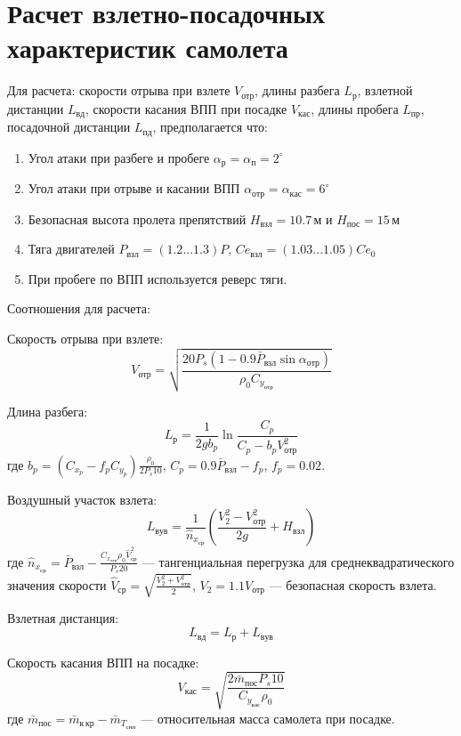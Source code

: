 \section{Расчет взлетно-посадочных характеристик самолета}
Для расчета: скорости отрыва при взлете $V_{отр}$, длины разбега
$L_{р}$, взлетной дистанции $L_{вд}$, скорости касания ВПП при посадке
$V_{кас}$, длины пробега $L_{пр}$, посадочной дистанции $L_{пд}$, предполагается что:
\begin{enumerate}
    \item Угол атаки при разбеге и пробеге $\alpha_р = \alpha_{п} = 2^\circ$ 
    \item Угол атаки при отрыве и касании ВПП $\alpha_{отр} = \alpha_{кас} = 6^\circ$
    \item Безопасная высота пролета препятствий $H_{взл} = 10.7\, м$ и $H_{пос} = 15\, м$
    \item Тяга двигателей $P_{взл} = (1.2 ... 1.3)P$, $Ce_{взл} = (1.03 ... 1.05) Ce_0$ 
    \item При пробеге по ВПП используется реверс тяги.
\end{enumerate}
Соотношения для расчета:

Скорость отрыва при взлете: 
\begin{equation}
    V_{отр} = \sqrt{\frac{20 P_s (1 - 0.9 \bar{P}_{взл} \sin{\alpha_{отр}})}
    {\rho_0 C_{y_{отр}}}}
\end{equation}

Длина разбега:
\begin{equation}
    L_р = \frac{1}{2 g b_p} \ln{\frac{C_p}{C_p -  b_p V_{отр}^2}} 
\end{equation}
где $b_p = (C_{x_p} - f_p C_{y_p}) \frac{\rho_0}{2 P_s 10}$, $C_p = 0.9
\bar{P}_{взл} - f_p$, $f_p = 0.02$.

Воздушный участок взлета:
\begin{equation}
    L_{вув} = \frac{1}{\hat{n}_{x_{ср}}} \left( \frac{V_2^2 - V_{отр}^2}{2g} +
    H_{взл}\right) 
\end{equation}
где  $\hat{n}_{x_{ср}} = \bar{P}_{взл} - \frac{C_{x_{отр}} \rho_0 \hat{V}_{ср}^2}
{P_s 20}$ --- тангенциальная перегрузка для среднеквадратического значения скорости
$\hat{V}_{ср} = \sqrt{\frac{V_2^2 + V_{отр}^2}{2}}$, $V_2 = 1.1 V_{отр}$ --- безопасная скорость взлета. 

Взлетная дистанция:
\begin{equation}
    L_{вд} = L_{р} + L_{вув}
\end{equation}

Скорость касания ВПП на посадке:
\begin{equation}
    V_{кас} = \sqrt{\frac{2 \bar{m}_{пос} P_s 10 }{ C_{y_{кас}} \rho_0 }}
\end{equation}
где $\bar{m}_{пос} = \bar{m}_{к\, кр} - \bar{m}_{T_{снп}}$ --- относительная
масса самолета при посадке.

